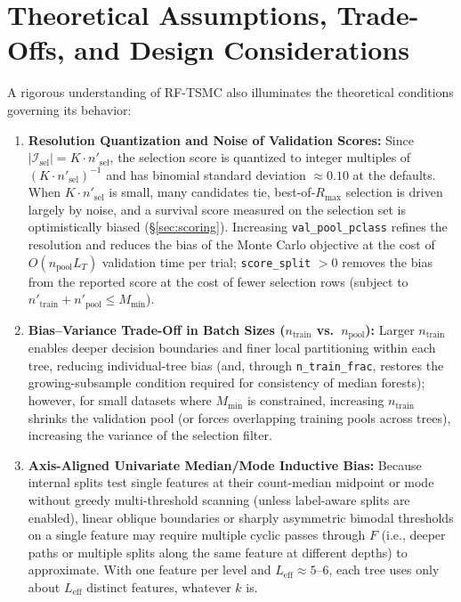 \documentclass[11pt,a4paper]{article}
\newcommand{\code}[1]{\texttt{#1}}
\begin{document}
\section{Theoretical Assumptions, Trade-Offs, and Design Considerations}
\label{sec:tradeoffs}

A rigorous understanding of RF-TSMC also illuminates the theoretical conditions governing its behavior:
\begin{enumerate}[leftmargin=*, itemsep=4pt]
  \item \textbf{Resolution Quantization and Noise of Validation Scores:}
  Since $|\mathcal{I}_{\text{sel}}| = K \cdot n'_{\text{sel}}$, the selection score is quantized to integer multiples of $(K \cdot n'_{\text{sel}})^{-1}$ and has binomial standard deviation $\approx 0.10$ at the defaults. When $K \cdot n'_{\text{sel}}$ is small, many candidates tie, best-of-$R_{\max}$ selection is driven largely by noise, and a survival score measured on the selection set is optimistically biased (\S\ref{sec:scoring}). Increasing \code{val\_pool\_pclass} refines the resolution and reduces the bias of the Monte Carlo objective at the cost of $O(n_{\text{pool}} L_T)$ validation time per trial; \code{score\_split} $> 0$ removes the bias from the reported score at the cost of fewer selection rows (subject to $n'_{\text{train}} + n'_{\text{pool}} \le M_{\min}$).

  \item \textbf{Bias--Variance Trade-Off in Batch Sizes ($n_{\text{train}}$ vs.\ $n_{\text{pool}}$):}
  Larger $n_{\text{train}}$ enables deeper decision boundaries and finer local partitioning within each tree, reducing individual-tree bias (and, through \code{n\_train\_frac}, restores the growing-subsample condition required for consistency of median forests); however, for small datasets where $M_{\min}$ is constrained, increasing $n_{\text{train}}$ shrinks the validation pool (or forces overlapping training pools across trees), increasing the variance of the selection filter.

  \item \textbf{Axis-Aligned Univariate Median/Mode Inductive Bias:}
  Because internal splits test single features at their count-median midpoint or mode without greedy multi-threshold scanning (unless label-aware splits are enabled), linear oblique boundaries or sharply asymmetric bimodal thresholds on a single feature may require multiple cyclic passes through $F$ (i.e., deeper paths or multiple splits along the same feature at different depths) to approximate. With one feature per level and $L_{\text{eff}} \approx 5$--$6$, each tree uses only about $L_{\text{eff}}$ distinct features, whatever $k$ is.


\end{enumerate}
\end{document}

